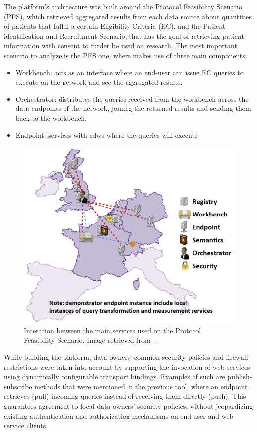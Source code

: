 The platform's architecture was built around the Protocol Feasibility Scenario (PFS), which retrieved aggregated results from each data source about quantities of patients that fulfill a certain Eligibility Criteria (EC), and the Patient identification and Recruitment Scenario, that has the goal of retrieving patient information with consent to furder be used on research.
The most important scenario to analyze is the PFS one, where makes use of three main components:
\begin{itemize}
    \item Workbench: acts as an interface where an end-user can issue EC queries to execute on the network and see the aggregated results.
    \item Orchestrator: distributes the queries received from the workbench across the data endpoints of the network, joining the returned results and sending them back to the workbench.
    \item Endpoint: services with \gls{cdw}s where the queries will execute
\end{itemize}

\begin{figure}[H]
    \centering
    \includegraphics[width=.7\linewidth]{ehr4cr.png}
    \caption{Interation between the main services used on the Protocol Feasibility Scenario. Image retrieved from~\cite{ehr4cr}.}
\end{figure}

While building the platform, data owners' common security policies and firewall restrictions were taken into account by supporting the invocation of web services using dynamically configurable transport bindings.
Examples of such are publish-subscribe methods that were mentioned in the previous tool, where an endpoint retrieves (pull) incoming queries instead of receiving them directly (push).
This guarantees agreement to local data owners' security policies, without jeopardizing existing authentication and authorization mechanisms on end-user and web service clients.

